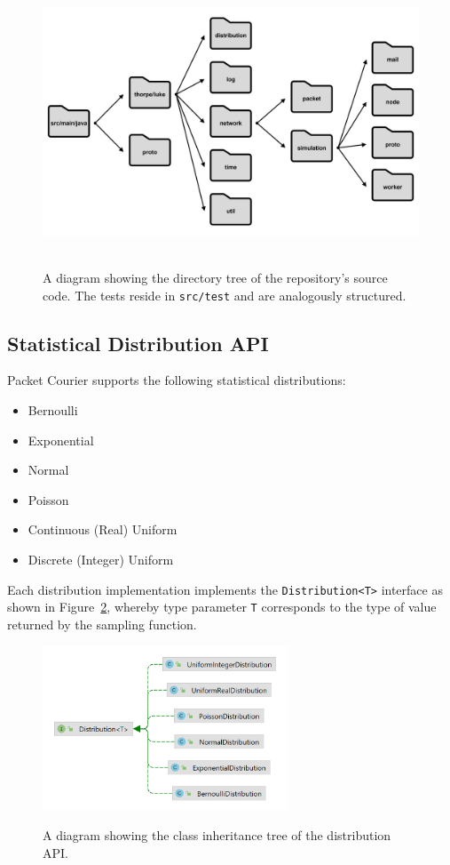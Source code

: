 \begin{figure}[!h]
    \includegraphics[width=\textwidth]{images/chapter_4_implementation/repository_structure}
    \centering~\caption{A diagram showing the directory tree of the repository's source code. The tests reside in
    \texttt{src/test} and are analogously structured.}
    \label{fig:chapter_4_implementation-repository_structure}
\end{figure}

\subsection{Statistical Distribution API}

Packet Courier supports the following statistical distributions:
\begin{itemize}
    \item Bernoulli
    \item Exponential
    \item Normal
    \item Poisson
    \item Continuous (Real) Uniform
    \item Discrete (Integer) Uniform
\end{itemize}

Each distribution implementation implements the \texttt{Distribution<T>} interface as shown in
Figure~\ref{fig:chapter_4_implementation-distribution_api_tree}, whereby type parameter \texttt{T} corresponds to the
type of value returned by the sampling function.

\begin{figure}[!h]
    \includegraphics[width=0.65\textwidth]{images/chapter_4_implementation/distribution_api_tree}
    \centering~\caption{A diagram showing the class inheritance tree of the distribution API.}
    \label{fig:chapter_4_implementation-distribution_api_tree}
\end{figure}

